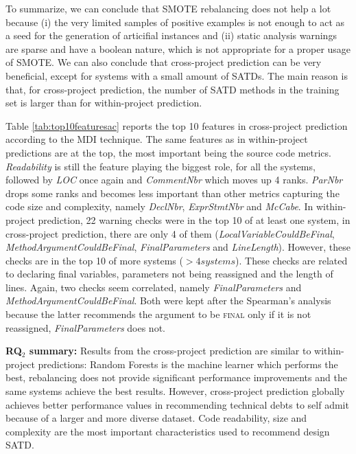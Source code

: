 To summarize, we can conclude that SMOTE rebalancing does not help a lot because (i) the very limited samples of positive examples is not enough to act as a seed for the generation of articifial instances  and (ii) static analysis warnings are sparse and have a boolean nature, which is not appropriate for a proper usage of SMOTE. We can also conclude that cross-project prediction can be very beneficial, except for systems with a small amount of SATDs. The main reason is that, for cross-project prediction, the number of SATD methods in the training set is larger than for within-project prediction.



Table \ref{tab:top10featuresac} reports the top 10 features in cross-project prediction according to the MDI technique. The same features as in within-project predictions are at the top, the most important being the source code metrics. \textit{Readability} is still the feature playing the biggest role, for all the systems, followed by \textit{LOC} once again and \textit{CommentNbr} which moves up 4 ranks. \textit{ParNbr} drops some ranks and becomes less important than other metrics capturing the code size and complexity, namely \textit{DeclNbr}, \textit{ExprStmtNbr} and \textit{McCabe}. In within-project prediction, 22 warning checks were in the top 10 of at least one system, in cross-project prediction, there are only 4 of them (\textit{LocalVariableCouldBeFinal}, \textit{MethodArgumentCouldBeFinal}, \textit{FinalParameters} and \textit{LineLength}). However, these checks are in the top 10 of more systems ($>4 systems$). These checks are related to declaring final variables, parameters not being reassigned and the length of lines. Again, two checks seem correlated, namely \textit{FinalParameters} and \textit{MethodArgumentCouldBeFinal}. Both were kept after the Spearman's analysis because the latter recommends the argument to be \textsc{final} only if it is not reassigned, \textit{FinalParameters} does not.

\begin{mdframed}
	{\bf RQ$_2$ summary:} Results from the cross-project prediction are similar to within-project predictions: Random Forests is the machine learner which performs the best, rebalancing does not provide significant performance improvements and the same systems achieve the best results. However, cross-project prediction globally achieves better performance values in recommending technical debts to self admit because of a larger and more diverse dataset. Code readability, size and complexity are the most important characteristics used to recommend design SATD.
\end{mdframed}

